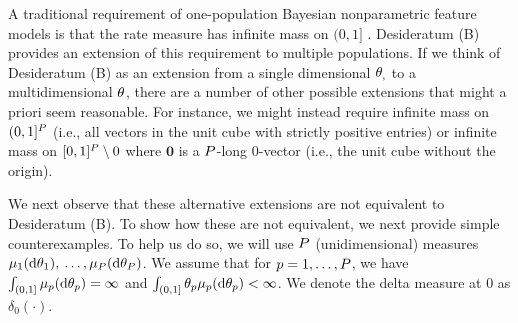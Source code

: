 \begin{myRemark}[On Desideratum (B)]
	\label{remark:inf_mass}
	A traditional requirement of one-population Bayesian nonparametric feature models is that the rate measure has infinite mass on $(0,1]$ \citep{Gnedin2007,Broderick2012}.
	Desideratum (B) provides an extension of this requirement to multiple populations. If we 
	think of Desideratum (B) as an extension from a single dimensional $\theta_{, }$ to a multidimensional $ \vecvariantfreq{}$, 
	there are a number of other possible extensions that might a priori seem reasonable.
	For instance, we might instead require infinite mass on $(0,1]^P$ (i.e., all vectors in the unit cube with strictly positive entries) or
	infinite mass on $[0,1]^\numpops\setminus{\bm{0}}$ where $\bm{0}$ is a $P$-long 0-vector (i.e., the unit cube without the origin).
	
	We next observe that these alternative extensions are not equivalent to Desideratum (B).
	To show how these are not equivalent, we next provide simple counterexamples. To help us do so, we will use $P$ (unidimensional) measures $\mu_{1}(\mathrm{d}\theta_{1}),$ $\dots ,\mu_{P}(\mathrm{d}\theta_{P})$. We assume that for $p=1,\dots,P$, we have $\int_{(0,1]} \mu_{p}(\mathrm{d}\theta_{p})=\infty$ and $\int_{(0,1]}\theta_{p} \mu_{p}(\mathrm{d}\theta_{p})<\infty$. We denote the delta measure at $0$ as $\delta_0(\cdot)$. 
	


\end{myRemark}
